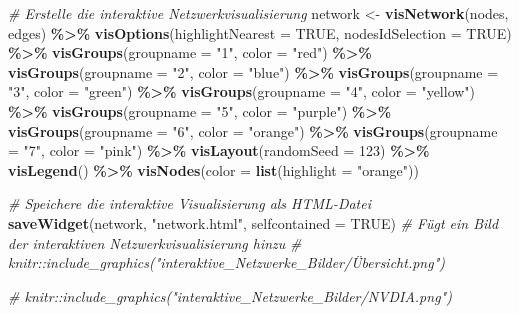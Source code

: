 \documentclass[
]{article}
\newenvironment{Shaded}{\begin{snugshade}}{\end{snugshade}}
\newcommand{\AttributeTok}[1]{\textcolor[rgb]{0.13,0.29,0.53}{#1}}
\newcommand{\CommentTok}[1]{\textcolor[rgb]{0.56,0.35,0.01}{\textit{#1}}}
\newcommand{\ConstantTok}[1]{\textcolor[rgb]{0.56,0.35,0.01}{#1}}
\newcommand{\DecValTok}[1]{\textcolor[rgb]{0.00,0.00,0.81}{#1}}
\newcommand{\FunctionTok}[1]{\textcolor[rgb]{0.13,0.29,0.53}{\textbf{#1}}}
\newcommand{\NormalTok}[1]{#1}
\newcommand{\OtherTok}[1]{\textcolor[rgb]{0.56,0.35,0.01}{#1}}
\newcommand{\SpecialCharTok}[1]{\textcolor[rgb]{0.81,0.36,0.00}{\textbf{#1}}}
\newcommand{\StringTok}[1]{\textcolor[rgb]{0.31,0.60,0.02}{#1}}
\begin{document}
\begin{Shaded}
\begin{Highlighting}[]
\CommentTok{\# Erstelle die interaktive Netzwerkvisualisierung}
\NormalTok{network }\OtherTok{\textless{}{-}} \FunctionTok{visNetwork}\NormalTok{(nodes, edges) }\SpecialCharTok{\%\textgreater{}\%}
  \FunctionTok{visOptions}\NormalTok{(}\AttributeTok{highlightNearest =} \ConstantTok{TRUE}\NormalTok{, }\AttributeTok{nodesIdSelection =} \ConstantTok{TRUE}\NormalTok{) }\SpecialCharTok{\%\textgreater{}\%}
  \FunctionTok{visGroups}\NormalTok{(}\AttributeTok{groupname =} \StringTok{"1"}\NormalTok{, }\AttributeTok{color =} \StringTok{"red"}\NormalTok{) }\SpecialCharTok{\%\textgreater{}\%}
  \FunctionTok{visGroups}\NormalTok{(}\AttributeTok{groupname =} \StringTok{"2"}\NormalTok{, }\AttributeTok{color =} \StringTok{"blue"}\NormalTok{) }\SpecialCharTok{\%\textgreater{}\%}
  \FunctionTok{visGroups}\NormalTok{(}\AttributeTok{groupname =} \StringTok{"3"}\NormalTok{, }\AttributeTok{color =} \StringTok{"green"}\NormalTok{) }\SpecialCharTok{\%\textgreater{}\%}
  \FunctionTok{visGroups}\NormalTok{(}\AttributeTok{groupname =} \StringTok{"4"}\NormalTok{, }\AttributeTok{color =} \StringTok{"yellow"}\NormalTok{) }\SpecialCharTok{\%\textgreater{}\%}
  \FunctionTok{visGroups}\NormalTok{(}\AttributeTok{groupname =} \StringTok{"5"}\NormalTok{, }\AttributeTok{color =} \StringTok{"purple"}\NormalTok{) }\SpecialCharTok{\%\textgreater{}\%}
  \FunctionTok{visGroups}\NormalTok{(}\AttributeTok{groupname =} \StringTok{"6"}\NormalTok{, }\AttributeTok{color =} \StringTok{"orange"}\NormalTok{) }\SpecialCharTok{\%\textgreater{}\%}
  \FunctionTok{visGroups}\NormalTok{(}\AttributeTok{groupname =} \StringTok{"7"}\NormalTok{, }\AttributeTok{color =} \StringTok{"pink"}\NormalTok{) }\SpecialCharTok{\%\textgreater{}\%}
  \FunctionTok{visLayout}\NormalTok{(}\AttributeTok{randomSeed =} \DecValTok{123}\NormalTok{) }\SpecialCharTok{\%\textgreater{}\%}
  \FunctionTok{visLegend}\NormalTok{() }\SpecialCharTok{\%\textgreater{}\%}
  \FunctionTok{visNodes}\NormalTok{(}\AttributeTok{color =} \FunctionTok{list}\NormalTok{(}\AttributeTok{highlight =} \StringTok{"orange"}\NormalTok{))}

\CommentTok{\# Speichere die interaktive Visualisierung als HTML{-}Datei}
\FunctionTok{saveWidget}\NormalTok{(network, }\StringTok{"network.html"}\NormalTok{, }\AttributeTok{selfcontained =} \ConstantTok{TRUE}\NormalTok{)}
\CommentTok{\# Fügt ein Bild der interaktiven Netzwerkvisualisierung hinzu}
\CommentTok{\# knitr::include\_graphics("interaktive\_Netzwerke\_Bilder/Übersicht.png")}

\CommentTok{\# knitr::include\_graphics("interaktive\_Netzwerke\_Bilder/NVDIA.png")}
\end{Highlighting}
\end{Shaded}
\end{document}
